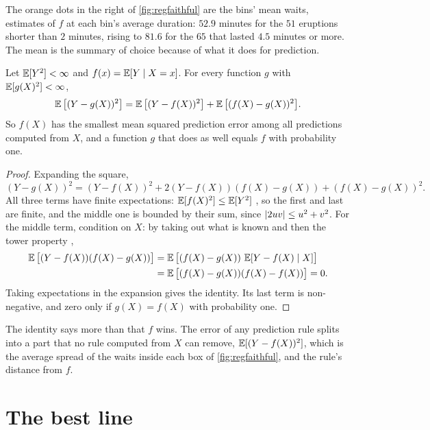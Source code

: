 The orange dots in the right of \cref{fig:regfaithful} are the bins' mean waits, estimates of $f$ at each bin's average duration: $52.9$ minutes for the $51$ eruptions shorter than $2$ minutes, rising to $81.6$ for the $65$ that lasted $4.5$ minutes or more.
The mean is the summary of choice because of what it does for prediction.

\begin{theorem}
\label{thm:best-predictor}
Let $\operatorname*{\mathbb{E}}[Y^2] < \infty$ and $f(x) = \operatorname*{\mathbb{E}}[Y \mid X = x]$.
For every function $g$ with $\operatorname*{\mathbb{E}}[g(X)^2] < \infty$,
\[
\operatorname*{\mathbb{E}}\big[(Y - g(X))^2\big] = \operatorname*{\mathbb{E}}\big[(Y - f(X))^2\big] + \operatorname*{\mathbb{E}}\big[(f(X) - g(X))^2\big].
\]
So $f(X)$ has the smallest mean squared prediction error among all predictions computed from $X$, and a function $g$ that does as well equals $f$ with probability one.
\end{theorem}
\begin{proof}
Expanding the square,
\[
(Y - g(X))^2 = (Y - f(X))^2 + 2(Y - f(X))(f(X) - g(X)) + (f(X) - g(X))^2.
\]
All three terms have finite expectations: $\operatorname*{\mathbb{E}}[f(X)^2] \leq \operatorname*{\mathbb{E}}[Y^2]$ , so the first and last are finite, and the middle one is bounded by their sum, since $\lvert2uv\rvert \leq u^2 + v^2$.
For the middle term, condition on $X$: by taking out what is known and then the tower property ,
\begin{align*}
\operatorname*{\mathbb{E}}\big[(Y - f(X))(f(X) - g(X))\big] &= \operatorname*{\mathbb{E}}\big[(f(X) - g(X))\,\operatorname*{\mathbb{E}}[Y - f(X) \mid X]\big] \\
&= \operatorname*{\mathbb{E}}\big[(f(X) - g(X))(f(X) - f(X))\big] = 0.
\end{align*}
Taking expectations in the expansion gives the identity.
Its last term is non-negative, and zero only if $g(X) = f(X)$ with probability one.
\end{proof}

The identity says more than that $f$ wins.
The error of any prediction rule splits into a part that no rule computed from $X$ can remove, $\operatorname*{\mathbb{E}}[(Y - f(X))^2]$, which is the average spread of the waits inside each box of \cref{fig:regfaithful}, and the rule's distance from $f$.

\section{The best line}
\label{sec:reg-line}

